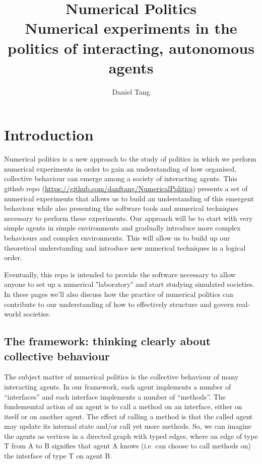 \documentclass[a4paper]{report}
\title{Numerical Politics\\
	\large Numerical experiments in the politics of interacting, autonomous agents}
\author{Daniel Tang}
\begin{document}
\maketitle

\chapter{Introduction}

Numerical politics is a new approach to the study of politics in which we perform numerical experiments in order to gain an understanding of how organised, collective behaviour can emerge among a society of interacting agents. This github repo (\url{https://github.com/danftang/NumericalPolitics}) presents a set of numerical experiments that allows us to build an understanding of this emergent behaviour while also presenting the software tools and numerical techniques necessary to perform these experiments. Our approach will be to start with very simple agents in simple environments and gradually introduce more complex behaviours and complex environments. This will allow us to build up our theoretical understanding and introduce new numerical techniques in a logical order.

Eventually, this repo is intended to provide the software necessary to allow anyone to set up a numerical "laboratory" and start studying simulated societies. In these pages we'll also discuss how the practice of numerical politics can contribute to our understanding of how to effectively structure and govern real-world societies.

\section{The framework: thinking clearly about collective behaviour}

The subject matter of numerical politics is the collective behaviour of many interacting agents. In our framework, each agent implements a number of ``interfaces'' and each interface implements a number of ``methods''. The fundememtal action of an agent is to call a method on an interface, either on itself or on another agent. The effect of calling a method is that the called agent may update its internal state and/or call yet more methods. So, we can imagine the agents as vertices in a directed graph with typed edges, where an edge of type T from A to B signifies that agent A knows (i.e. can choose to call methods on) the interface of type T on agent B. 
\end{document}
